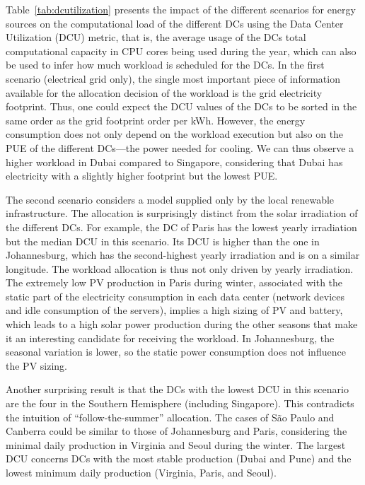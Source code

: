 Table~\ref{tab:dcutilization} presents the impact of the different scenarios for energy sources on the computational load of the different DCs using the Data Center Utilization (DCU) metric, that is, the average usage of the DCs total computational capacity in CPU cores being used during the year, which can also be used to infer how much workload is scheduled for the DCs. In the first scenario (electrical grid only), the single most important piece of information available for the allocation decision of the workload is the grid electricity footprint. Thus, one could expect the DCU values of the DCs to be sorted in the same order as the grid footprint order per kWh. However, the energy consumption does not only depend on the workload execution but also on the PUE of the different DCs---the power needed for cooling. We can thus observe a higher workload in Dubai compared to Singapore, considering that Dubai has electricity with a slightly higher footprint but the lowest PUE. 

The second scenario considers a model supplied only by the local renewable infrastructure. The allocation is surprisingly distinct from the solar irradiation of the different DCs. For example, the DC of Paris has the lowest yearly irradiation but the median DCU in this scenario. Its DCU is higher than the one in Johannesburg, which has the second-highest yearly irradiation and is on a similar longitude. The workload allocation is thus not only driven by yearly irradiation. The extremely low PV production in Paris during winter, associated with the static part of the electricity consumption in each data center (network devices and idle consumption of the servers), implies a high sizing of PV and battery, which leads to a high solar power production during the other seasons that make it an interesting candidate for receiving the workload. In Johannesburg, the seasonal variation is lower, so the static power consumption does not influence the PV sizing.


Another surprising result is that the DCs with the lowest DCU in this scenario are the four in the Southern Hemisphere (including Singapore). This contradicts the intuition of ``follow-the-summer'' allocation. The cases of S\~ao Paulo and Canberra could be similar to those of Johannesburg and Paris, considering the minimal daily production in Virginia and Seoul during the winter. The largest DCU concerns DCs with the most stable production (Dubai and Pune) and the lowest minimum daily production (Virginia, Paris, and Seoul). 



